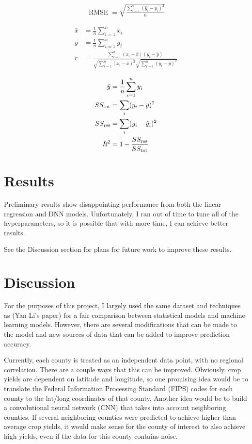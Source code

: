 \documentclass[letterpaper]{article}
\begin{document}
\begin{align*}
\operatorname{RMSE} = \sqrt{\frac{\sum_{i=1}^n (\hat y_i - y_i)^2}{n}}
\end{align*}

\begin{align*}
\bar{x} &= \frac{1}{n}\sum_{i=1}^n x_i \\
\bar{y} &= \frac{1}{n}\sum_{i=1}^n y_i \\
r &= \frac{\sum ^n _{i=1}(x_i - \bar{x})(y_i - \bar{y})}{\sqrt{\sum ^n _{i=1}(x_i - \bar{x})^2} \sqrt{\sum ^n _{i=1}(y_i - \bar{y})^2}}
\end{align*}

\begin{align*}
\bar{y} &= \frac{1}{n}\sum_{i=1}^n y_i \\
SS_\text{tot} &= \sum_i (y_i-\bar{y})^2 \\
SS_\text{res} &= \sum_i (y_i - \hat y_i)^2 \\
R^2 &= 1 - \frac{SS_{\rm res}}{SS_{\rm tot}}
\end{align*}

\section{Results}

Preliminary results show disappointing performance from both the linear regression and DNN models. Unfortunately, I ran out of time to tune all of the hyperparameters, so it is possible that with more time, I can achieve better results.

See the Discussion section for plans for future work to improve these results.

\section{Discussion}

For the purposes of this project, I largely used the same dataset and techniques as (Yan Li's paper) for a fair comparison between statistical models and machine learning models. However, there are several modifications that can be made to the model and new sources of data that can be added to improve prediction accuracy.

Currently, each county is treated as an independent data point, with no regional correlation. There are a couple ways that this can be improved. Obviously, crop yields are dependent on latitude and longitude, so one promising idea would be to translate the Federal Information Processing Standard (FIPS) codes for each county to the lat/long coordinates of that county. Another idea would be to build a convolutional neural network (CNN) that takes into account neighboring counties. If several neighboring counties were predicted to achieve higher than average crop yields, it would make sense for the county of interest to also achieve high yields, even if the data for this county contains noise.
\end{document}
